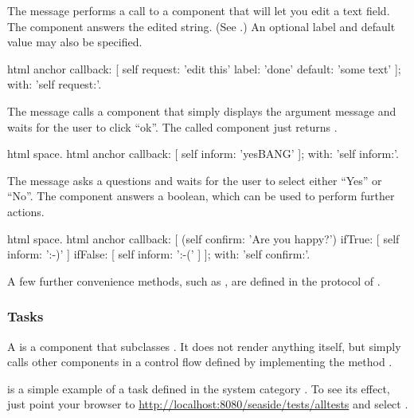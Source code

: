 \documentclass[a4paper,10pt,twoside]{book}
\begin{document}
The message  performs a call to a component that will let you edit a text field.
The component answers the edited string.
(See .)
An optional label and default value may also be specified.

\begin{code}{}
html anchor
	callback: [ self request: 'edit this' label: 'done' default: 'some text' ];
	with: 'self request:'.
\end{code}

The message  calls a component that simply displays the argument message and waits for the user to click ``ok''.
The called component just returns .

\begin{code}{}
html space.
html anchor
	callback: [ self inform: 'yesBANG' ];
	with: 'self inform:'.
\end{code}

The message  asks a questions and waits for the user to select either ``Yes'' or ``No''.
The component answers a boolean, which can be used to perform further actions.

\begin{code}{}
html space.
html anchor
	callback: [
		(self confirm: 'Are you happy?')
			ifTrue: [ self inform: ':-)' ]
			ifFalse: [ self inform: ':-(' ]
		];
	with: 'self confirm:'.
\end{code}

A few further convenience methods, such as , are defined in the  protocol of .

\subsubsection{Tasks}

A  is a component that subclasses .
It does not render anything itself, but simply calls other components in a control flow defined by implementing the method .

 is a simple example of a task defined in the system category .
To see its effect, just point your browser to \url{http://localhost:8080/seaside/tests/alltests} and select .
\end{document}
